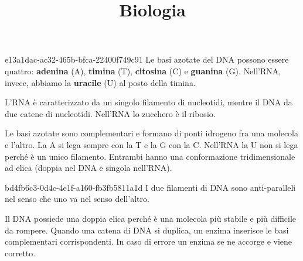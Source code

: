 \documentclass[preview]{standalone}
\begin{document}
\title{Biologia}
\genpage


\begin{snippet}{e13a1dac-ac32-465b-bfca-22400f749c91}
    Le basi azotate del DNA possono essere quattro:
    \textbf{adenina} (A),
    \textbf{timina} (T),
    \textbf{citosina} (C) e
    \textbf{guanina} (G).
    Nell'RNA, invece, abbiamo la \textbf{uracile} (U) al posto della timina.

    L'RNA è caratterizzato da un singolo filamento di nucleotidi,
    mentre il DNA da due catene di nucleotidi.
    Nell'RNA lo zucchero è il ribosio.


    Le basi azotate sono complementari e formano di ponti idrogeno
    fra una molecola e l'altro.
    La A si lega sempre con la T e la G con la C.
    Nell'RNA la U non si lega perché è un unico filamento.
    Entrambi hanno una conformazione tridimensionale ad elica
    (doppia nel DNA e singola nell'RNA).
\end{snippet}


\begin{snippet}{bd4fb6c3-0d4c-4e1f-a160-fb3fb5811a1d}
    I due filamenti di DNA sono anti-paralleli nel senso
    che uno va nel senso dell'altro.

    Il DNA possiede una doppia elica perché è una molecola
    più stabile e più difficile da rompere.
    Quando una catena di DNA si duplica, un enzima
    inserisce le basi complementari corrispondenti.
    In caso di errore un enzima se ne accorge e viene corretto.
\end{snippet}
\end{document}
